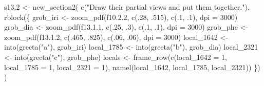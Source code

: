 \documentclass[
]{article}
\newenvironment{Shaded}{\begin{snugshade}}{\end{snugshade}}
\newcommand{\AttributeTok}[1]{\textcolor[rgb]{0.77,0.63,0.00}{#1}}
\newcommand{\DecValTok}[1]{\textcolor[rgb]{0.00,0.00,0.81}{#1}}
\newcommand{\FloatTok}[1]{\textcolor[rgb]{0.00,0.00,0.81}{#1}}
\newcommand{\FunctionTok}[1]{\textcolor[rgb]{0.00,0.00,0.00}{#1}}
\newcommand{\NormalTok}[1]{#1}
\newcommand{\OtherTok}[1]{\textcolor[rgb]{0.56,0.35,0.01}{#1}}
\newcommand{\StringTok}[1]{\textcolor[rgb]{0.31,0.60,0.02}{#1}}
\begin{document}
\begin{Shaded}
\begin{Highlighting}[]
\NormalTok{s13}\FloatTok{.2} \OtherTok{\textless{}{-}} \FunctionTok{new\_section2}\NormalTok{(}
  \FunctionTok{c}\NormalTok{(}\StringTok{"Draw their partial views and put them together."}\NormalTok{),}
  \FunctionTok{rblock}\NormalTok{(\{}
\NormalTok{    grob\_iri }\OtherTok{\textless{}{-}} \FunctionTok{zoom\_pdf}\NormalTok{(f10.}\FloatTok{2.2}\NormalTok{, }\FunctionTok{c}\NormalTok{(.}\DecValTok{28}\NormalTok{, .}\DecValTok{515}\NormalTok{), }\FunctionTok{c}\NormalTok{(.}\DecValTok{1}\NormalTok{, .}\DecValTok{1}\NormalTok{), }\AttributeTok{dpi =} \DecValTok{3000}\NormalTok{)}
\NormalTok{    grob\_dia }\OtherTok{\textless{}{-}} \FunctionTok{zoom\_pdf}\NormalTok{(f13.}\FloatTok{1.1}\NormalTok{, }\FunctionTok{c}\NormalTok{(.}\DecValTok{25}\NormalTok{, .}\DecValTok{3}\NormalTok{), }\FunctionTok{c}\NormalTok{(.}\DecValTok{1}\NormalTok{, .}\DecValTok{1}\NormalTok{), }\AttributeTok{dpi =} \DecValTok{3000}\NormalTok{)}
\NormalTok{    grob\_phe }\OtherTok{\textless{}{-}} \FunctionTok{zoom\_pdf}\NormalTok{(f13.}\FloatTok{1.2}\NormalTok{, }\FunctionTok{c}\NormalTok{(.}\DecValTok{465}\NormalTok{, .}\DecValTok{825}\NormalTok{), }\FunctionTok{c}\NormalTok{(.}\DecValTok{06}\NormalTok{, .}\DecValTok{06}\NormalTok{), }\AttributeTok{dpi =} \DecValTok{3000}\NormalTok{)}
\NormalTok{    local\_1642 }\OtherTok{\textless{}{-}} \FunctionTok{into}\NormalTok{(}\FunctionTok{grecta}\NormalTok{(}\StringTok{"a"}\NormalTok{), grob\_iri)}
\NormalTok{    local\_1785 }\OtherTok{\textless{}{-}} \FunctionTok{into}\NormalTok{(}\FunctionTok{grecta}\NormalTok{(}\StringTok{"b"}\NormalTok{), grob\_dia)}
\NormalTok{    local\_2321 }\OtherTok{\textless{}{-}} \FunctionTok{into}\NormalTok{(}\FunctionTok{grecta}\NormalTok{(}\StringTok{"c"}\NormalTok{), grob\_phe)}
\NormalTok{    locals }\OtherTok{\textless{}{-}} \FunctionTok{frame\_row}\NormalTok{(}\FunctionTok{c}\NormalTok{(}\AttributeTok{local\_1642 =} \DecValTok{1}\NormalTok{, }\AttributeTok{local\_1785 =} \DecValTok{1}\NormalTok{, }\AttributeTok{local\_2321 =} \DecValTok{1}\NormalTok{),}
      \FunctionTok{namel}\NormalTok{(local\_1642, local\_1785, local\_2321))}
\NormalTok{  \})}
\NormalTok{)}


\end{Highlighting}
\end{Shaded}
\end{document}
